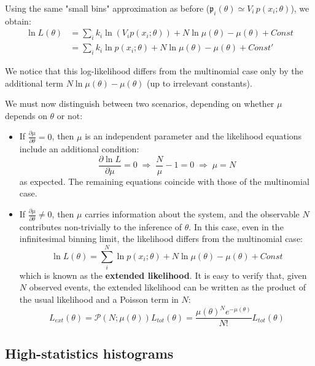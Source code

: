 Using the same "small bins" approximation as before ($\mathfrak{p}_i(\theta)\simeq V_i\,p(x_i;\theta)$), we obtain:
\begin{align*}
	\ln L(\theta)&=\sum_i k_i \ln (V_i p(x_i;\theta)) + N \ln \mu(\theta) - \mu(\theta) + Const \\
	&=\sum_i k_i \ln p(x_i;\theta)+ N \ln \mu(\theta) - \mu(\theta) + Const'
\end{align*}

We notice that this log-likelihood differs from the multinomial case only by the additional term $N \ln \mu(\theta) - \mu(\theta)$ (up to irrelevant constants).

We must now distinguish between two scenarios, depending on whether $\mu$ depends on $\theta$ or not:

\begin{itemize}
    \item If $\frac{\partial \mu}{\partial \theta} = 0$, then $\mu$ is an independent parameter and the likelihood equations include an additional condition:
    \[
		\frac{\partial \ln L}{\partial \mu} = 0 
		\;\Rightarrow\; \frac{N}{\mu} - 1 = 0 
		\;\Rightarrow\; \hat{\mu} = N
	\]
	as expected. The remaining equations coincide with those of the multinomial case.

    \item If $\frac{\partial \mu}{\partial \theta} \neq 0$, then $\mu$ carries information about the system, and the observable $N$ contributes non-trivially to the inference of $\theta$. In this case, even in the infinitesimal binning limit, the likelihood differs from the multinomial case:
	\begin{equation}
		\ln L(\theta)=\sum_i^{N}\ln p(x_i; \theta) + N \ln \mu(\theta) - \mu(\theta) + Const
		\label{eq:extended_likelihood}
	\end{equation}
	which is known as the \textbf{extended likelihood}. It is easy to verify that, given $N$ observed events, the extended likelihood can be written as the product of the usual likelihood and a Poisson term in $N$:
	\[
		L_{ext}(\theta)=\mathcal{P}(N;\mu(\theta))L_{tot}(\theta)=\frac{\mu(\theta)^Ne^{-\mu(\theta)}}{N!}L_{tot}(\theta)
	\]
\end{itemize}

\subsection{High-statistics histograms}

